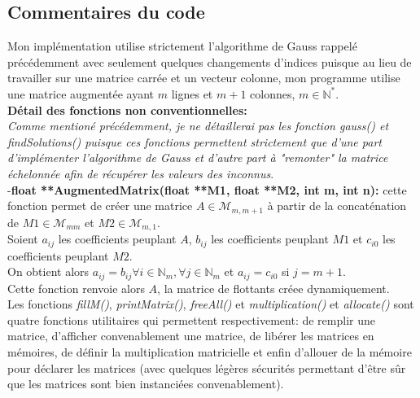 \subsection{Commentaires du code}
Mon implémentation utilise strictement l'algorithme de Gauss rappelé précédemment avec seulement quelques changements d'indices puisque au lieu de travailler sur une matrice carrée et un vecteur colonne, mon programme utilise une matrice augmentée ayant $m$ lignes et $m+1$ colonnes, $m\in \mathbb{N}^*$. \\
\textbf{Détail des fonctions non conventionnelles:}\\
\textit{Comme mentioné précédemment, je ne détaillerai pas les fonction gauss() et findSolutions() puisque ces fonctions permettent strictement que d'une part d'implémenter l'algorithme de Gauss et d'autre part à "remonter" la matrice échelonnée afin de récupérer les valeurs des inconnus}. \\
-\textbf{float **AugmentedMatrix(float **M1, float **M2, int m, int n):} cette fonction permet de créer une matrice $A \in \mathcal{M}_{m,m+1}$ à partir de la concaténation de $M1 \in \mathcal{M}_{mm}$ et $M2 \in \mathcal{M}_{m,1}$. \\
Soient $a_{ij}$ les coefficients peuplant $A$, $b_{ij}$ les coefficients peuplant $M1$ et $c_{i0}$ les coefficients peuplant $M2$. \\
On obtient alors $a_{ij} = b_{ij} \forall i \in \mathbb{N}_{m}, \forall j \in \mathbb{N}_{m}$ et $a_{ij} = c_{i0}$ si $j = m+1$. \\
Cette fonction renvoie alors $A$, la matrice de flottants créee dynamiquement. \\
Les fonctions \textit{fillM()}, \textit{printMatrix()}, \textit{freeAll()} et \textit{multiplication()} et \textit{allocate()} sont quatre fonctions utilitaires qui permettent respectivement: de remplir une matrice, d'afficher convenablement une matrice, de libérer les matrices en mémoires, de définir la multiplication matricielle et enfin d'allouer de la mémoire pour déclarer les matrices (avec quelques légères sécurités permettant d'être sûr que les matrices sont bien instanciées convenablement). 
